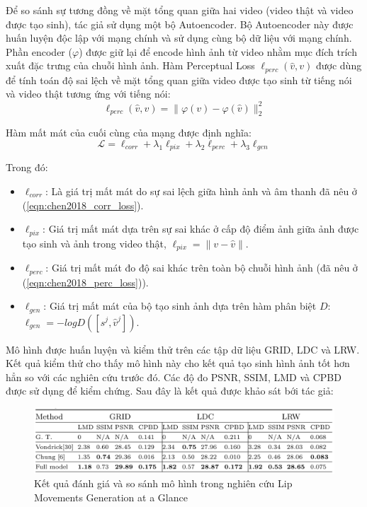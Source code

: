 Để so sánh sự tương đồng về mặt tổng quan giữa hai video (video thật và video được tạo sinh), tác giả sử dụng một bộ Autoencoder. Bộ Autoencoder này được huấn luyện độc lập với mạng chính và sử dụng cùng bộ dữ liệu với mạng chính. Phần encoder ($\varphi$) được giữ lại để encode hình ảnh từ video nhằm mục đích trích xuất đặc trưng của chuỗi hình ảnh. Hàm Perceptual Loss $\ell_{perc}(\hat{v}, v)$ được dùng để tính toán độ sai lệch về mặt tổng quan giữa video được tạo sinh từ tiếng nói và video thật tương ứng với tiếng nói:
\begin{equation}
    \ell_{perc}(\hat{v}, v) = \|\varphi(v) - \varphi(\hat{v})\|^2_2
    \label{eqn:chen2018_perc_loss}
\end{equation}

Hàm mất mát của cuối cùng của mạng được định nghĩa:
\begin{equation}
    \mathcal{L} = \ell_{corr} + \lambda_1\ell_{pix} + \lambda_2\ell_{perc} + \lambda_3\ell_{gen}
    \label{eqn:chen2018_loss}
\end{equation}

Trong đó:
\begin{itemize}
\item $\ell_{corr}$: Là giá trị mất mát do sự sai lệch giữa hình ảnh và âm thanh đã nêu ở (\ref{eqn:chen2018_corr_loss}).
\item $\ell_{pix}$: Giá trị mất mát dựa trên sự sai khác ở cấp độ điểm ảnh giữa ảnh được tạo sinh và ảnh trong video thật, $\ell_{pix} = \|v-\hat{v}\|$.
\item $\ell_{perc}$: Giá trị mất mát đo độ sai khác trên toàn bộ chuỗi hình ảnh (đã nêu ở (\ref{eqn:chen2018_perc_loss})).
\item $\ell_{gen}$: Giá trị mất mát của bộ tạo sinh ảnh dựa trên hàm phân biệt $D$: $\ell_{gen} = -logD([s^j, \hat{v}^j])$.
\end{itemize}

Mô hình được huấn luyện và kiểm thử trên các tập dữ liệu GRID, LDC và LRW. Kết quả kiểm thử cho thấy mô hình này cho kết quả tạo sinh hình ảnh tốt hơn hẳn so với các nghiên cứu trước đó. Các độ đo PSNR, SSIM, LMD và CPBD được sử dụng để kiểm chứng. Sau đây là kết quả được khảo sát bới tác giả:

\begin{figure}[H]
    \centering
    \includegraphics[width=15cm]{./content/images/chen2018_result.png}
    \caption{Kết quả đánh giá và so sánh mô hình trong nghiên cứu Lip Movements Generation at a Glance}
    \label{fig:chen2018_result}
\end{figure}

